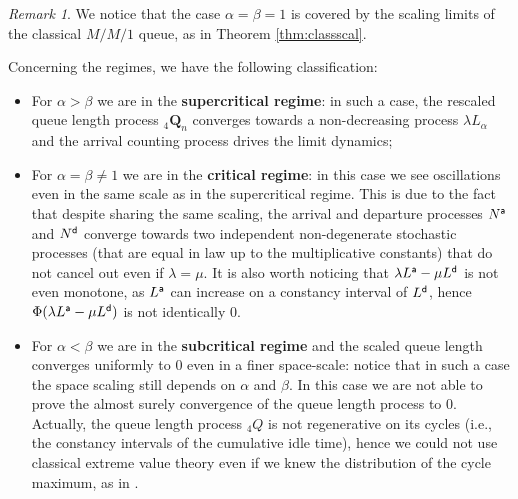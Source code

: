 \documentclass[]{amsart}
\numberwithin{equation}{section}
\theoremstyle{remark}
\newtheorem{rmk}[thm]{Remark}
\theoremstyle{definition}
\begin{document}
\begin{rmk}
We notice that the case $\alpha=\beta=1$ is covered by the scaling limits of the classical $M/M/1$ queue, as in Theorem \ref{thm:classscal}. 	
\end{rmk}
Concerning the regimes, we have the following classification:
\begin{itemize}
	\item For $\alpha>\beta$ we are in the \textbf{supercritical regime}: in such a case, the rescaled queue length process ${}_4\mathbf{Q}_n$ converges towards a non-decreasing process $\lambda L_\alpha$ and the arrival counting process drives the limit dynamics;
	\item For $\alpha=\beta \not = 1$ we are in the \textbf{critical regime}: in this case we see oscillations even in the same scale as in the supercritical regime. This is due to the fact that despite sharing the same scaling, the arrival and departure processes $N^{\sf a}$ and $N^{\sf d}$ converge towards two independent non-degenerate stochastic processes (that are equal in law up to the multiplicative constants) that do not cancel out even if $\lambda=\mu$. It is also worth noticing that $\lambda L^{\sf a}-\mu L^{\sf d}$ is not even monotone, as $L^{\sf a}$ can increase on a constancy interval of $L^{\sf d}$, hence $\Phi(\lambda L^{\sf a}-\mu L^{\sf d})$ is not identically $0$.
	\item For $\alpha<\beta$ we are in the \textbf{subcritical regime} and the scaled queue length converges uniformly to $0$ even in a finer space-scale: notice that in such a case the space scaling still depends on $\alpha$ and $\beta$. In this case we are not able to prove the almost surely convergence of the queue length process to $0$. Actually, the queue length process ${}_4Q$ is not regenerative on its cycles (i.e., the constancy intervals of the cumulative idle time), hence we could not use classical extreme value theory even if we knew the distribution of the cycle maximum, as in \cite{asmussen1998extreme}.
\end{itemize}
\end{document}
